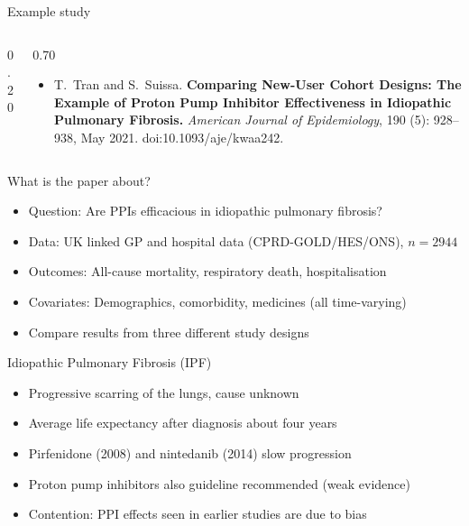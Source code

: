 \documentclass[aspectratio=169,12pt]{beamer} %
\begin{document}
\begin{frame}{Example study}
\begin{columns}
\begin{column}{0.20\contentwidth}
\begin{tikzpicture}
\end{tikzpicture}
\end{column}
\begin{column}{0.70\contentwidth}
	\begin{itemize}
		\item T.~Tran and S.~Suissa. \textbf{Comparing {New}-{User} {Cohort} {Designs}: {The} {Example} of {Proton} {Pump} {Inhibitor} {Effectiveness} in {Idiopathic} {Pulmonary} {Fibrosis}.} \emph{American Journal of Epidemiology}, 190 (5): 928--938, May 2021. doi:10.1093/aje/kwaa242.
\nocite{tran_comparing_2021}
	\end{itemize}
\end{column}
\end{columns}
\end{frame}

\begin{frame}{What is the paper about?}
    \begin{itemize}
	\item Question: Are PPIs efficacious in idiopathic pulmonary fibrosis?
	\item Data: UK linked GP and hospital data (CPRD-GOLD/HES/ONS), $n=2944$
	\item Outcomes: All-cause mortality, respiratory death, hospitalisation
	\item Covariates: Demographics, comorbidity, medicines (all time-varying)
	\item Compare results from three different study designs
    \end{itemize}
\end{frame}

\begin{frame}{Idiopathic Pulmonary Fibrosis (IPF)}
    \begin{itemize}
        \item Progressive scarring of the lungs, cause unknown
	\item Average life expectancy after diagnosis about four years
	\item Pirfenidone (2008) and nintedanib (2014) slow progression
	\item Proton pump inhibitors also guideline recommended (weak evidence)
	\item Contention: PPI effects seen in earlier studies are due to bias
    \end{itemize}
\end{frame}
\end{document}
